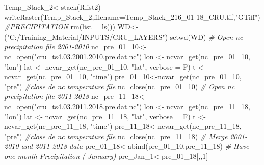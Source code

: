 \documentclass[
  10pt,
  b5paper,
]{book}
\newenvironment{Shaded}{\begin{snugshade}}{\end{snugshade}}
\newcommand{\AttributeTok}[1]{\textcolor[rgb]{0.77,0.63,0.00}{#1}}
\newcommand{\CommentTok}[1]{\textcolor[rgb]{0.56,0.35,0.01}{\textit{#1}}}
\newcommand{\DecValTok}[1]{\textcolor[rgb]{0.00,0.00,0.81}{#1}}
\newcommand{\FunctionTok}[1]{\textcolor[rgb]{0.00,0.00,0.00}{#1}}
\newcommand{\NormalTok}[1]{#1}
\newcommand{\OtherTok}[1]{\textcolor[rgb]{0.56,0.35,0.01}{#1}}
\newcommand{\StringTok}[1]{\textcolor[rgb]{0.31,0.60,0.02}{#1}}
\begin{document}
\begin{Shaded}
\begin{Highlighting}[]
\NormalTok{Temp\_Stack\_2}\OtherTok{\textless{}{-}}\FunctionTok{stack}\NormalTok{(Rlist2)}
\FunctionTok{writeRaster}\NormalTok{(Temp\_Stack\_2,}\AttributeTok{filename=}\StringTok{\textquotesingle{}Temp\_Stack\_216\_01{-}18\_CRU.tif\textquotesingle{}}\NormalTok{,}\StringTok{"GTiff"}\NormalTok{) }
 \CommentTok{\#PRECIPITATION}
 \FunctionTok{rm}\NormalTok{(}\AttributeTok{list =} \FunctionTok{ls}\NormalTok{())}
\NormalTok{WD}\OtherTok{\textless{}{-}}\NormalTok{(}\StringTok{"C:/Training\_Material/INPUTS/CRU\_LAYERS"}\NormalTok{)}
\FunctionTok{setwd}\NormalTok{(WD)}
 \CommentTok{\# Open nc precipitation file 2001{-}2010}
\NormalTok{nc\_pre\_01\_10}\OtherTok{\textless{}{-}}\FunctionTok{nc\_open}\NormalTok{(}\StringTok{"cru\_ts4.03.2001.2010.pre.dat.nc"}\NormalTok{)}
\NormalTok{ lon }\OtherTok{\textless{}{-}} \FunctionTok{ncvar\_get}\NormalTok{(nc\_pre\_01\_10, }\StringTok{"lon"}\NormalTok{)}
\NormalTok{lat }\OtherTok{\textless{}{-}} \FunctionTok{ncvar\_get}\NormalTok{(nc\_pre\_01\_10, }\StringTok{"lat"}\NormalTok{, }\AttributeTok{verbose =}\NormalTok{ F)}
\NormalTok{t }\OtherTok{\textless{}{-}} \FunctionTok{ncvar\_get}\NormalTok{(nc\_pre\_01\_10, }\StringTok{"time"}\NormalTok{)}
\NormalTok{ pre\_01\_10}\OtherTok{\textless{}{-}}\FunctionTok{ncvar\_get}\NormalTok{(nc\_pre\_01\_10, }\StringTok{"pre"}\NormalTok{)}
 \CommentTok{\#close de nc temperature file}
 \FunctionTok{nc\_close}\NormalTok{(nc\_pre\_01\_10) }
 \CommentTok{\# Open nc precipitation file 2011{-}2018}
\NormalTok{nc\_pre\_11\_18}\OtherTok{\textless{}{-}}\FunctionTok{nc\_open}\NormalTok{(}\StringTok{"cru\_ts4.03.2011.2018.pre.dat.nc"}\NormalTok{)}
\NormalTok{ lon }\OtherTok{\textless{}{-}} \FunctionTok{ncvar\_get}\NormalTok{(nc\_pre\_11\_18, }\StringTok{"lon"}\NormalTok{)}
\NormalTok{lat }\OtherTok{\textless{}{-}} \FunctionTok{ncvar\_get}\NormalTok{(nc\_pre\_11\_18, }\StringTok{"lat"}\NormalTok{, }\AttributeTok{verbose =}\NormalTok{ F)}
\NormalTok{t }\OtherTok{\textless{}{-}} \FunctionTok{ncvar\_get}\NormalTok{(nc\_pre\_11\_18, }\StringTok{"time"}\NormalTok{)}
\NormalTok{ pre\_11\_18}\OtherTok{\textless{}{-}}\FunctionTok{ncvar\_get}\NormalTok{(nc\_pre\_11\_18, }\StringTok{"pre"}\NormalTok{)}
 \CommentTok{\#close de nc temperature file}
 \FunctionTok{nc\_close}\NormalTok{(nc\_pre\_11\_18) }
 \CommentTok{\# Merge 2001{-}2010 and 2011{-}2018 data }
\NormalTok{ pre\_01\_18}\OtherTok{\textless{}{-}}\FunctionTok{abind}\NormalTok{(pre\_01\_10,pre\_11\_18)}
\CommentTok{\# Have one month Precipitation ( January)}
\NormalTok{ pre\_Jan\_1}\OtherTok{\textless{}{-}}\NormalTok{pre\_01\_18[,,}\DecValTok{1}\NormalTok{]}

\end{Highlighting}
\end{Shaded}
\end{document}
